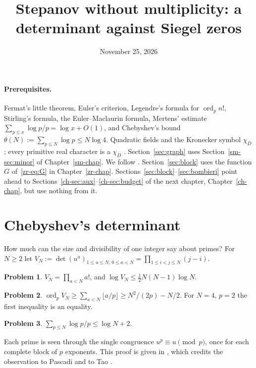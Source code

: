 \documentclass[reqno]{amsart}
\title{Stepanov without multiplicity: a determinant against Siegel zeros}
\author{}
\date{November 25, 2026}
\newcounter{chap}
\theoremstyle{definition}
\newtheorem{problem}{Problem}[section]
\theoremstyle{plain}
\newcommand{\ord}{\operatorname{ord}}
\begin{document}
\maketitle
{}\label{chap}

\paragraph{Prerequisites.}
Fermat's little theorem, Euler's criterion, Legendre's formula for \(\ord_p n!\), Stirling's formula, the Euler--Maclaurin formula, Mertens' estimate \(\sum_{p \le x} \log p/p = \log x + O(1)\), and Chebyshev's bound \(\theta(N) := \sum_{p \le N} \log p \le N \log 4\).  Quadratic fields and the Kronecker symbol \(\chi_D\); every primitive real character is a \(\chi_D\) \cite[Ch.~5]{Dav}.  Section~\ref{sec:graph} uses Section~\ref{sm-sec:minor} of Chapter~\ref{sm-chap}.  We follow \cite[\S\S2--8, App.~D]{N}.  Section~\ref{sec:block} uses the function \(G\) of~\eqref{zr-eq:G} in Chapter~\ref{zr-chap}.  Sections~\ref{sec:block}--\ref{sec:bombieri} point ahead to Sections~\ref{ch-sec:aux}--\ref{ch-sec:budget} of the next chapter, Chapter~\ref{ch-chap}, but use nothing from it.

\section{Chebyshev's determinant}\label{sec:chebyshev}

How much can the size and divisibility of one integer say about primes?  For \(N \ge 2\) let \(V_N := \det(u^a)_{1 \le u \le N,\, 0 \le a < N} = \prod_{1 \le i < j \le N} (j - i)\).

\begin{problem}\label{pr:vandermonde}
\(V_N = \prod_{a < N} a!\), and \(\log V_N \le \frac12 N(N-1) \log N\).
\end{problem}

\begin{problem}\label{pr:ordVN}
\(\ord_p V_N \ge \sum_{a < N} \lfloor a/p \rfloor \ge N^2/(2p) - N/2\).  For \(N = 4\), \(p = 2\) the first inequality is an equality.
\end{problem}

\begin{problem}\label{pr:mertens-upper}
\(\sum_{p \le N} \log p/p \le \log N + 2\).
\end{problem}

Each prime is seen through the single congruence \(u^p \equiv u \pmod p\), once for each complete block of \(p\) exponents.  This proof is given in \cite[App.~A]{N}, which credits the observation to Pascadi and to Tao \cite{Tao}.
\end{document}
